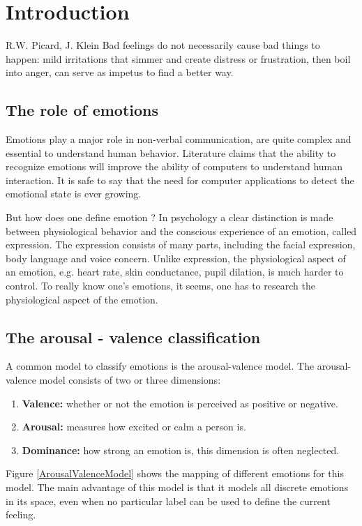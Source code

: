 \chapter{Introduction}

\begin{chapquote}{R.W. Picard, J. Klein\cite{CompRecognizeEmotion}}
Bad feelings do not necessarily cause bad things to happen: mild irritations that simmer and create distress or frustration, then boil into anger, can serve as impetus to find a better way.
\end{chapquote}

\section{The role of emotions}
Emotions play a major role in non-verbal communication, are quite complex and essential to understand human behavior. Literature claims that the ability to recognize emotions will improve the ability of computers to understand human interaction\cite{CompRecognizeEmotion}. It is safe to say that the need for computer applications to detect the emotional state is ever growing. 

\npar

But how does one define emotion ? In psychology a clear distinction is made between physiological behavior and the conscious experience of an emotion, called expression\cite{ExtendedPaper}. The expression consists of many parts, including the facial expression, body language and voice concern. Unlike expression, the physiological aspect of an emotion, e.g. heart rate, skin conductance, pupil dilation, is much harder to control. To really know one's emotions, it seems, one has to research the physiological aspect of the emotion.

\section{The arousal - valence classification}
A common model to classify emotions is the arousal-valence model\cite{ExtendedPaper}\cite{RealTimeEEGEmotion}. The arousal-valence model consists of two or three dimensions: 
\begin{enumerate}
\item \textbf{Valence:} whether or not the emotion is perceived as positive or negative.
\item \textbf{Arousal:} measures how excited or calm a person is.
\item \textbf{Dominance:} how strong an emotion is, this dimension is often neglected.
\end{enumerate}
Figure \ref{ArousalValenceModel} shows the mapping of different emotions for this model. The main advantage of this model is that it models all discrete emotions in its space, even when no particular label can be used to define the current feeling. 

